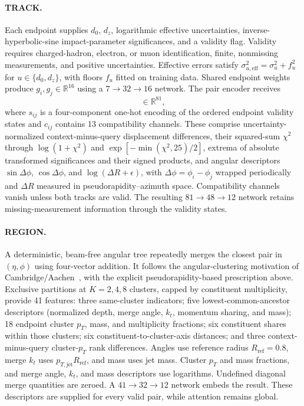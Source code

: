 \paragraph{TRACK.}
Each endpoint supplies $d_0$, $d_z$, logarithmic effective uncertainties,
inverse-hyperbolic-sine impact-parameter significances, and a validity flag.
Validity requires charged-hadron, electron, or muon identification, finite,
nonmissing measurements, and positive uncertainties. Effective errors satisfy
$\sigma_{u,\mathrm{eff}}^2=\sigma_u^2+f_u^2$ for $u\in\{d_0,d_z\}$, with
floors $f_u$ fitted on training data. Shared endpoint weights produce
$g_i,g_j\in\mathbb R^{16}$ using a $7\!\to\!32\!\to\!16$ network.
The pair encoder receives
\begin{equation}
 [g_i,g_j,g_j-g_i,g_i\odot g_j,s_{ij},c_{ij}]\in\mathbb R^{81},
 \label{eq:track-pairs}
\end{equation}
where $s_{ij}$ is a four-component one-hot encoding of the ordered endpoint
validity states and $c_{ij}$ contains 13 compatibility channels. These comprise
uncertainty-normalized context-minus-query displacement differences, their
squared-sum $\chi^2$ through $\log(1+\chi^2)$ and
$\exp[-\min(\chi^2,25)/2]$, extrema of absolute transformed significances and
their signed products, and angular descriptors $\sin\Delta\phi$,
$\cos\Delta\phi$, and $\log(\Delta R+\epsilon)$, with
$\Delta\phi=\phi_i-\phi_j$ wrapped periodically and $\Delta R$ measured in
pseudorapidity--azimuth space. Compatibility channels vanish unless both
tracks are valid. The resulting $81\!\to\!48\!\to\!12$ network retains
missing-measurement information through the validity states.

\paragraph{REGION.}
A deterministic, beam-free angular tree repeatedly merges the closest pair
in $(\eta,\phi)$ using four-vector addition. It follows the angular-clustering
motivation of Cambridge/Aachen~\cite{Dokshitzer1997Cambridge,Wobisch1999Cambridge},
with the explicit pseudorapidity-based prescription above. Exclusive partitions
at $K=2,4,8$ clusters, capped by constituent multiplicity, provide 41 features:
three same-cluster indicators; five lowest-common-ancestor descriptors
(normalized depth, merge angle, $k_t$, momentum sharing, and mass); 18 endpoint
cluster $p_T$, mass, and multiplicity fractions; six constituent shares within
those clusters; six constituent-to-cluster-axis distances; and three
context-minus-query cluster-$p_T$ rank differences. Angles use reference radius
$R_{\mathrm{ref}}=0.8$, merge $k_t$ uses $p_{T,\mathrm{jet}}R_{\mathrm{ref}}$,
and mass uses jet mass. Cluster $p_T$ and mass fractions, and merge angle,
$k_t$, and mass descriptors use logarithms. Undefined diagonal merge quantities
are zeroed. A $41\!\to\!32\!\to\!12$ network embeds the result. These descriptors
are supplied for every valid pair, while attention remains global.

